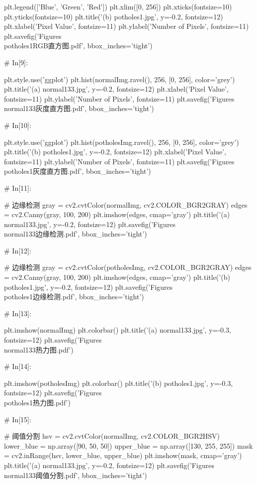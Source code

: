 \documentclass{MathorCupmodeling}
\begin{document}
\begin{python}
plt.legend(['Blue', 'Green', 'Red'])
plt.xlim([0, 256])
plt.xticks(fontsize=10)
plt.yticks(fontsize=10)
plt.title('(b) potholes1.jpg', y=-0.2, fontsize=12)
plt.xlabel('Pixel Value', fontsize=11)
plt.ylabel('Number of Pixels', fontsize=11)
plt.savefig('Figures\\potholes1RGB直方图.pdf', bbox_inches='tight')

# In[9]:


plt.style.use('ggplot')
plt.hist(normalImg.ravel(), 256, [0, 256], color='grey')
plt.title('(a) normal133.jpg', y=-0.2, fontsize=12)
plt.xlabel('Pixel Value', fontsize=11)
plt.ylabel('Number of Pixels', fontsize=11)
plt.savefig('Figures\\normal133灰度直方图.pdf', bbox_inches='tight')

# In[10]:


plt.style.use('ggplot')
plt.hist(potholesImg.ravel(), 256, [0, 256], color='grey')
plt.title('(b) potholes1.jpg', y=-0.2, fontsize=12)
plt.xlabel('Pixel Value', fontsize=11)
plt.ylabel('Number of Pixels', fontsize=11)
plt.savefig('Figures\\potholes1灰度直方图.pdf', bbox_inches='tight')

# In[11]:


# 边缘检测
gray = cv2.cvtColor(normalImg, cv2.COLOR_BGR2GRAY)
edges = cv2.Canny(gray, 100, 200)
plt.imshow(edges, cmap='gray')
plt.title('(a) normal133.jpg', y=-0.2, fontsize=12)
plt.savefig('Figures\\normal133边缘检测.pdf', bbox_inches='tight')

# In[12]:


# 边缘检测
gray = cv2.cvtColor(potholesImg, cv2.COLOR_BGR2GRAY)
edges = cv2.Canny(gray, 100, 200)
plt.imshow(edges, cmap='gray')
plt.title('(b) potholes1.jpg', y=-0.2, fontsize=12)
plt.savefig('Figures\\potholes1边缘检测.pdf', bbox_inches='tight')

# In[13]:


plt.imshow(normalImg)
plt.colorbar()
plt.title('(a) normal133.jpg', y=-0.3, fontsize=12)
plt.savefig('Figures\\normal133热力图.pdf')

# In[14]:


plt.imshow(potholesImg)
plt.colorbar()
plt.title('(b) potholes1.jpg', y=-0.3, fontsize=12)
plt.savefig('Figures\\potholes1热力图.pdf')

# In[15]:


# 阈值分割
hsv = cv2.cvtColor(normalImg, cv2.COLOR_BGR2HSV)
lower_blue = np.array([90, 50, 50])
upper_blue = np.array([130, 255, 255])
mask = cv2.inRange(hsv, lower_blue, upper_blue)
plt.imshow(mask, cmap='gray')
plt.title('(a) normal133.jpg', y=-0.2, fontsize=12)
plt.savefig('Figures\\normal133阈值分割.pdf', bbox_inches='tight')


\end{python}
\end{document}
